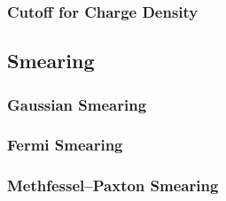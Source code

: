         \subsubsection{Cutoff for Charge Density}
    \subsection{Smearing}
        \subsubsection{Gaussian Smearing}
        \subsubsection{Fermi Smearing}
        \subsubsection{Methfessel–Paxton Smearing}





